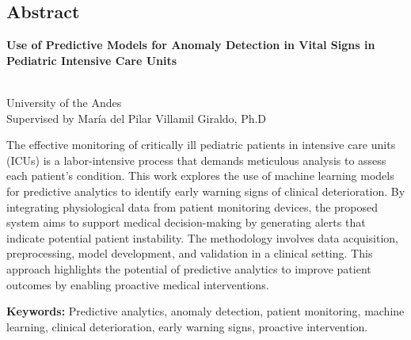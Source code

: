 \begin{titlepage}
  \centering
  \newpage
  \pagestyle{empty}

  \chapter*{Abstract}
  \vspace{0.8cm}

  {\bf\centering Use of Predictive Models for Anomaly Detection in Vital Signs in Pediatric Intensive Care Units} \\
  \vspace{0.8cm}

  \begin{flushright}
    \AuthorName \\
    University of the Andes \\
    Supervised by María del Pilar Villamil Giraldo, Ph.D
  \end{flushright}

  \vspace{0.5cm}

  \justifying The effective monitoring of critically ill pediatric patients in intensive care units (ICUs) is a labor-intensive process that demands meticulous analysis to assess each patient's condition. This work explores the use of machine learning models for predictive analytics to identify early warning signs of clinical deterioration. By integrating physiological data from patient monitoring devices, the proposed system aims to support medical decision-making by generating alerts that indicate potential patient instability. The methodology involves data acquisition, preprocessing, model development, and validation in a clinical setting. This approach highlights the potential of predictive analytics to improve patient outcomes by enabling proactive medical interventions.

  \begin{flushleft}
    \vspace{0.5cm}
    \textbf{Keywords:} Predictive analytics, anomaly detection, patient monitoring, machine learning, clinical deterioration, early warning signs,  proactive intervention.

  \end{flushleft}

\end{titlepage}
